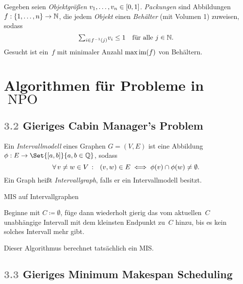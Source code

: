 \documentclass{cheat-sheet}
\DeclareMathOperator{\NPO}{NPO} %
\newcommand{\Problem}[1]{\textcolor{ProblemColor}{\textbf{#1}}}
\newcommand{\scriptSection}[1]{\textcolor{gray}{#1}\enspace}
\begin{document}
\begin{problem}[\Problem{Minimum Bin Packing}]
  Gegeben seien \textit{Objektgrößen} $v_1, \ldots, v_n \in \left[ 0, 1 \right]$.
  \textit{Packungen} sind Abbildungen $f : \{ 1, \ldots, n \} \to \mathbb{N}$, die jedem \textit{Objekt} einen \textit{Behälter} (mit Volumen 1) zuweisen, sodass
  \[
    {\sum}_{i \in f^{-1}(j)} v_i \leq 1 \quad
    \text{für alle $j \in \N$.}
  \]
  Gesucht ist ein~$f$ mit minimaler Anzahl $\max \operatorname{im}(f)$ von Behältern.
\end{problem}

\newpage

\section{Algorithmen für Probleme in~$\NPO$}


\subsection{\scriptSection{3.2} Gieriges \Problem{Cabin Manager's Problem}}

\begin{defn}
  Ein \emph{Intervallmodell} eines Graphen $G = (V, E)$ ist eine Abbildung $\phi : E \to \Set{\cinterval{a}{b}}{a, b \in \Q}$, sodass
  \[
    \forall \, {v \neq w \in V} \,:\, \enspace
    (v, w) \in E \iff \phi(v) \cap \phi(w) \neq \emptyset.
  \]
  Ein Graph heißt \emph{Intervallgraph}, falls er ein Intervallmodell besitzt.
\end{defn}

\begin{problem}
  MIS auf Intervallgraphen
\end{problem}


\begin{alg}
  Beginne mit $C \coloneqq \emptyset$, füge dann wiederholt gierig das vom aktuellen~$C$ unabhängige Intervall mit dem kleinsten Endpunkt zu~$C$ hinzu, bis es kein solches Intervall mehr gibt.
\end{alg}

\begin{satz}
  Dieser Algorithmus berechnet tatsächlich ein MIS\@.
\end{satz}

\subsection{\scriptSection{3.3} Gieriges \Problem{Minimum Makespan Scheduling}}
\end{document}
